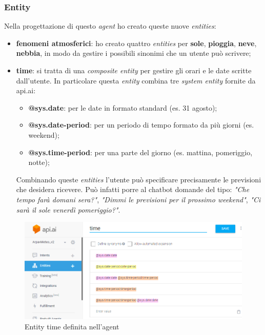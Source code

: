 \subsubsection{Entity}
Nella progettazione di questo \emph{agent} ho creato queste nuove \emph{entities}:
\begin{itemize}
	\item \textbf{fenomeni atmosferici}: ho creato quattro \emph{entities} per \textbf{sole}, \textbf{pioggia}, \textbf{neve}, \textbf{nebbia}, in modo da gestire i possibili sinonimi che un utente può scrivere;
	\item \textbf{time}: si tratta di una \emph{composite entity} per gestire gli orari e le date scritte dall'utente. In particolare questa \emph{entity} combina tre \emph{system entity} fornite da api.ai:
	\begin{itemize}
		\item \textbf{@sys.date}: per le date in formato standard (es. 31 agosto);
		\item \textbf{@sys.date-period}: per un periodo di tempo formato da più giorni (es. weekend);
		\item \textbf{@sys.time-period}: per una parte del giorno (es. mattina, pomeriggio, notte);
	\end{itemize}
Combinando queste \emph{entities} l'utente può specificare precisamente le previsioni che desidera ricevere. Può infatti porre al \gls{chatbot} domande del tipo: \emph{"Che tempo farà domani sera?"}, \emph{"Dimmi le previsioni per il prossimo weekend"}, \emph{"Ci sarà il sole venerdì pomeriggio?"}.
\end{itemize}
\begin{figure}[!h]
	\centering
	\includegraphics[scale=0.5]{../Immagini/time.png}
	\caption{Entity time definita nell'agent}
\end{figure}
\newpage
